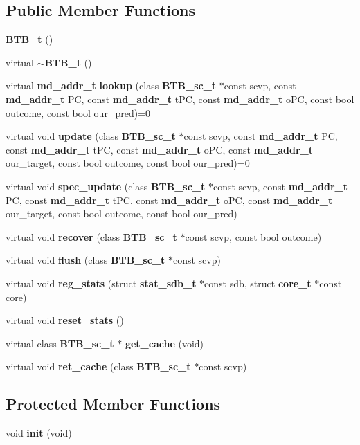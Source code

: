 \subsection*{Public Member Functions}
\begin{CompactItemize}
\item 
{\bf BTB\_\-t} ()
\item 
virtual {\bf $\sim$BTB\_\-t} ()
\item 
virtual {\bf md\_\-addr\_\-t} {\bf lookup} (class {\bf BTB\_\-sc\_\-t} $\ast$const scvp, const {\bf md\_\-addr\_\-t} PC, const {\bf md\_\-addr\_\-t} tPC, const {\bf md\_\-addr\_\-t} oPC, const bool outcome, const bool our\_\-pred)=0
\item 
virtual void {\bf update} (class {\bf BTB\_\-sc\_\-t} $\ast$const scvp, const {\bf md\_\-addr\_\-t} PC, const {\bf md\_\-addr\_\-t} tPC, const {\bf md\_\-addr\_\-t} oPC, const {\bf md\_\-addr\_\-t} our\_\-target, const bool outcome, const bool our\_\-pred)=0
\item 
virtual void {\bf spec\_\-update} (class {\bf BTB\_\-sc\_\-t} $\ast$const scvp, const {\bf md\_\-addr\_\-t} PC, const {\bf md\_\-addr\_\-t} tPC, const {\bf md\_\-addr\_\-t} oPC, const {\bf md\_\-addr\_\-t} our\_\-target, const bool outcome, const bool our\_\-pred)
\item 
virtual void {\bf recover} (class {\bf BTB\_\-sc\_\-t} $\ast$const scvp, const bool outcome)
\item 
virtual void {\bf flush} (class {\bf BTB\_\-sc\_\-t} $\ast$const scvp)
\item 
virtual void {\bf reg\_\-stats} (struct {\bf stat\_\-sdb\_\-t} $\ast$const sdb, struct {\bf core\_\-t} $\ast$const core)
\item 
virtual void {\bf reset\_\-stats} ()
\item 
virtual class {\bf BTB\_\-sc\_\-t} $\ast$ {\bf get\_\-cache} (void)
\item 
virtual void {\bf ret\_\-cache} (class {\bf BTB\_\-sc\_\-t} $\ast$const scvp)
\end{CompactItemize}
\subsection*{Protected Member Functions}
\begin{CompactItemize}
\item 
void {\bf init} (void)
\end{CompactItemize}
